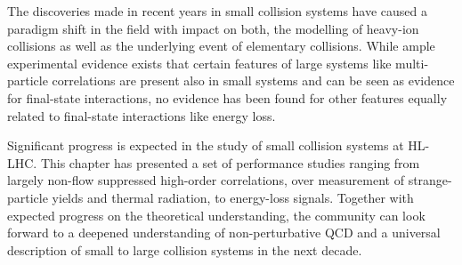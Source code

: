 \documentclass[../report.tex]{subfiles}
\begin{document}
The discoveries made in recent years in small collision systems have caused a paradigm shift in the field with impact on both, the modelling of heavy-ion collisions as well as the underlying event of elementary \pp collisions. While ample experimental evidence exists that certain features of large systems like multi-particle correlations are present also in small systems and can be seen as evidence for final-state interactions, no evidence has been found for other features equally related to final-state interactions like energy loss. 

Significant progress is expected in the study of small collision systems at HL-LHC. This chapter has presented a set of performance studies ranging from largely non-flow suppressed high-order correlations, over measurement of strange-particle yields and thermal radiation, to energy-loss signals. Together with expected progress on the theoretical understanding, the community can look forward to a deepened understanding of non-perturbative QCD and a universal description of small to large collision systems in the next decade.
\end{document}
